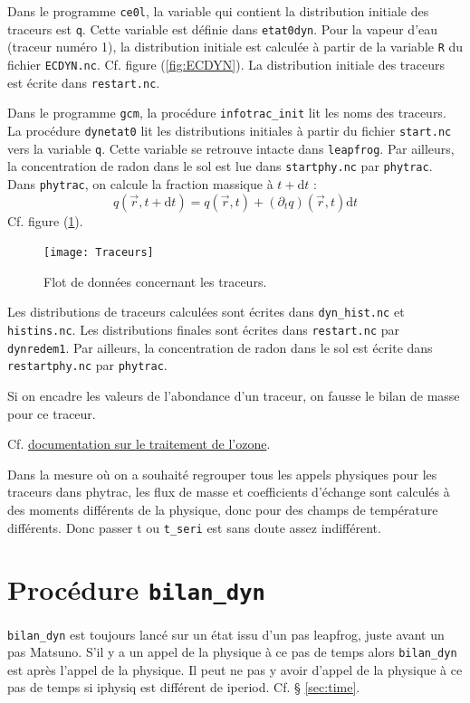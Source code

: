 \documentclass[a4paper,english,french]{article}
\newcommand{\ud}{\mathrm{d}}
\begin{document}
Dans le programme \verb+ce0l+, la variable qui contient la
distribution initiale des traceurs est \verb+q+. Cette variable est
définie dans \verb+etat0dyn+. Pour la vapeur d'eau (traceur numéro 1), la
distribution initiale est calculée à partir de la variable \verb+R+ du
fichier \verb+ECDYN.nc+. Cf. figure (\ref{fig:ECDYN}). La
distribution initiale des traceurs est écrite dans \verb+restart.nc+.

Dans le programme \verb+gcm+, la procédure \verb+infotrac_init+ lit les
noms des traceurs. La procédure \verb+dynetat0+ lit les distributions
initiales à partir du fichier \verb+start.nc+ vers la variable
\verb+q+. Cette variable se retrouve intacte dans \verb+leapfrog+. Par
ailleurs, la concentration de radon dans le sol est lue dans
\verb+startphy.nc+ par \verb+phytrac+. Dans \verb+phytrac+, on calcule
la fraction massique à $t + \ud t$ :
\begin{displaymath}
  q(\vec r, t + \ud t) = q(\vec r, t) + (\partial_t q)(\vec r, t)\ud t
\end{displaymath}
Cf. figure (\ref{fig:Traceurs}).
\begin{figure}
  \centering
  \texttt{[image: Traceurs]}
  \caption{Flot de données concernant les traceurs.}
  \label{fig:Traceurs}
\end{figure}
Les distributions de traceurs calculées sont écrites dans
\verb+dyn_hist.nc+ et \verb+histins.nc+. Les distributions finales
sont écrites dans \verb+restart.nc+ par \verb+dynredem1+. Par
ailleurs, la concentration de radon dans le sol est écrite dans
\verb+restartphy.nc+ par \verb+phytrac+.

Si on encadre les valeurs de l'abondance d'un traceur, on fausse le
bilan de masse pour ce traceur.

Cf. \href{../Ozone_texfol/ozone.pdf}{documentation sur le traitement
  de l'ozone}.

Dans la mesure où on a souhaité regrouper tous les appels physiques
pour les traceurs dans phytrac, les flux de masse et coefficients
d'échange sont calculés à des moments différents de la physique, donc
pour des champs de température différents. Donc passer t ou
\verb+t_seri+ est sans doute assez indifférent.

\section{Procédure \texttt{bilan\_dyn}}

\verb+bilan_dyn+ est toujours lancé sur un état issu d'un pas
leapfrog, juste avant un pas Matsuno. S'il y a un appel de la physique
à ce pas de temps alors \verb+bilan_dyn+ est après l'appel de la
physique. Il peut ne pas y avoir d'appel de la physique à ce pas de
temps si iphysiq est différent de iperiod. Cf. § \ref{sec:time}.
\end{document}
